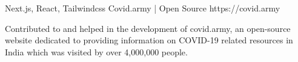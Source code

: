 \begin{cventries}


\cventry
{Next.js, React, Tailwindcss } %
{Covid.army | Open Source } %
{https://covid.army } %
{} %
{
	\begin{cvitems} %
		\item {Contributed to and helped in the development of covid.army, an open-source website dedicated to providing information on COVID-19 related resources in India which was visited by over 4,000,000 people.}
	\end{cvitems}
}


\end{cventries}

